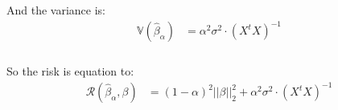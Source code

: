 \begin{frame}[fragile] \frametitle{}

And the variance is:
\begin{align*}
\mathbb{V} \left( \widehat{\beta}_{\alpha}  \right) &= \alpha^2 \sigma^2 \cdot (X^t X)^{-1}
\end{align*}

\end{frame}

\begin{frame}[fragile] \frametitle{}

So the risk is equation to:
\begin{align*}
\mathcal{R} (\widehat{\beta}_{\alpha}, \beta) &= (1-\alpha)^2 ||\beta||_2^2 + \alpha^2 \sigma^2 \cdot (X^t X)^{-1}
\end{align*}

\end{frame}






















